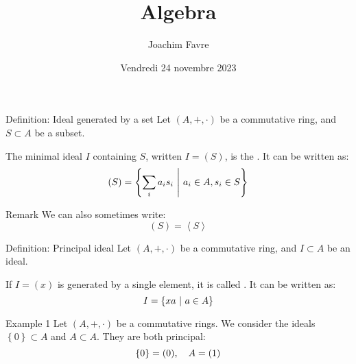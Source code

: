 \documentclass[a4paper]{article}
\title{Algebra}
\author{Joachim Favre}
\date{Vendredi 24 novembre 2023}
\begin{document}
\maketitle



\begin{parag}{Definition: Ideal generated by a set}
    Let $\left(A, +,\cdot \right)$ be a commutative ring, and $S \subset A$ be a subset.

    The minimal ideal $I$ containing $S$, written $I =\left(S\right)$, is the . It can be written as: 
    \[\left(S\right) = \left\{\sum_{i}^{} a_i s_i \suchthat a_i \in A, s_i \in S\right\}\]

    \begin{subparag}{Remark}
        We can also sometimes write: 
        \[\left(S\right) = \left\langle S \right\rangle\]
    \end{subparag}
\end{parag}

\begin{parag}{Definition: Principal ideal}
    Let $\left(A, +, \cdot \right)$ be a commutative ring, and $I \subset A$ be an ideal.

    If $I = \left(x\right)$ is generated by a single element, it is called . It can be written as: 
    \[I = \left\{xa \suchthat a \in A\right\}\]
\end{parag}

\begin{parag}{Example 1}
    Let $\left(A, +, \cdot \right)$ be a commutative rings. We consider the ideals $\left\{0\right\} \subset A$ and $A \subset A$. They are both principal:
    \[\left\{0\right\} = \left(0\right), \mathspace A = \left(1\right)\]
\end{parag}
\end{document}
